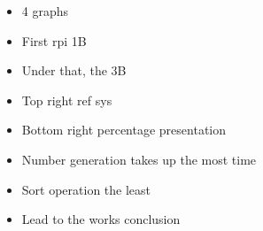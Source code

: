\begin{itemize}
    \item 4 graphs
    \item First rpi 1B
    \item Under that, the 3B
    \item Top right ref sys
    \item Bottom right percentage presentation
\end{itemize}

\begin{itemize}
    \item Number generation takes up the most time
    \item Sort operation the least
    \item Lead to the works conclusion
\end{itemize}
